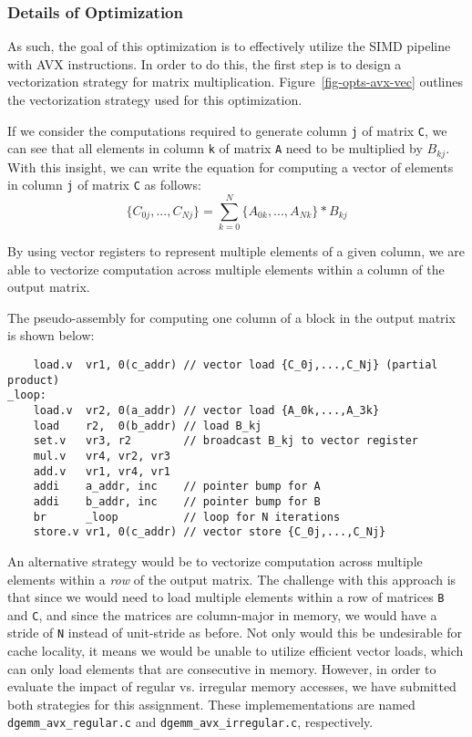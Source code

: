 \subsubsection{Details of Optimization}


As such, the goal of this optimization is to effectively utilize the SIMD
pipeline with AVX instructions. In order to do this, the first step is to
design a vectorization strategy for matrix
multiplication. Figure~\ref{fig-opts-avx-vec} outlines the
vectorization strategy used for this optimization.
\smallskip

If we consider the computations required to generate column {\tt{j}} of
matrix {\tt{C}}, we can see that all elements in column {\tt{k}} of matrix
{\tt{A}} need to be multiplied by $B_{kj}$. With this insight, we can
write the equation for computing a vector of elements in column {\tt{j}} of
matrix {\tt{C}} as follows:
\[
\{C_{0j},...,C_{Nj}\} = \sum_{k=0}^{N}\{A_{0k},...,A_{Nk}\}*B_{kj}
\]
\smallskip

By using vector registers to represent multiple elements of a given
column, we are able to vectorize computation across multiple elements
within a column of the output matrix.
\smallskip

The pseudo-assembly for computing one column of a block in the output
matrix is shown below:
\smallskip

\begin{verbatim}
    load.v  vr1, 0(c_addr) // vector load {C_0j,...,C_Nj} (partial product)
_loop:
    load.v  vr2, 0(a_addr) // vector load {A_0k,...,A_3k}
    load    r2,  0(b_addr) // load B_kj
    set.v   vr3, r2        // broadcast B_kj to vector register
    mul.v   vr4, vr2, vr3
    add.v   vr1, vr4, vr1
    addi    a_addr, inc    // pointer bump for A
    addi    b_addr, inc    // pointer bump for B
    br      _loop          // loop for N iterations
    store.v vr1, 0(c_addr) // vector store {C_0j,...,C_Nj}
\end{verbatim}
\smallskip

An alternative strategy would be to vectorize computation across
multiple elements within a \emph{row} of the output matrix. The challenge
with this approach is that since we would need to load multiple elements
within a row of matrices {\tt{B}} and {\tt{C}}, and since the matrices
are column-major in memory, we would have a stride of {\tt{N}} instead of
unit-stride as before. Not only would this be undesirable for cache
locality, it means we would be unable to utilize efficient vector loads,
which can only load elements that are consecutive in memory. However, in
order to evaluate the impact of regular vs. irregular memory accesses, we
have submitted both strategies for this assignment. These
implemementations are named {\tt{dgemm\_avx\_regular.c}} and
{\tt{dgemm\_avx\_irregular.c}}, respectively.
\smallskip


